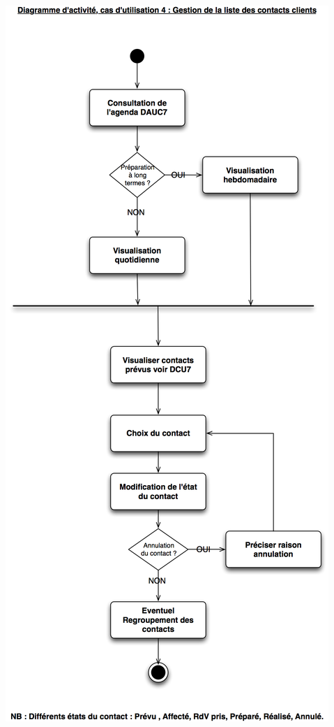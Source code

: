 \begin {center}
\includegraphics[width=\textwidth]{../../diagrammeActivite/DACU4.png}

\end{center}
